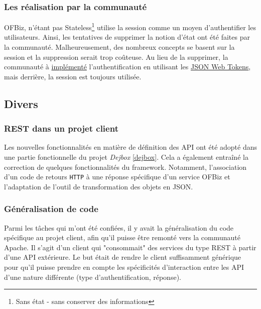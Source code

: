 \subsubsection{Les réalisation par la communauté}
OFBiz, n'étant pas Stateless\footnote{Sans état - sans conserver des informations} utilise la session comme un moyen d'authentifier les utilisateurs. Ainsi, les tentatives de supprimer la notion d'état ont été faites par la communauté. Malheureusement, des nombreux concepts se basent sur la  session et la suppression serait trop coûteuse. Au lieu de la supprimer, la communauté à \href{https://issues.apache.org/jira/browse/OFBIZ-9833}{implémenté} l'authentification en utilisant les \href{https://jwt.io/introduction/}{JSON Web Tokens}, mais derrière, la session est toujours utilisée.
\subsection{Divers}
\subsubsection{REST dans un projet client}
Les nouvelles fonctionnalités en matière de définition des API ont été adopté dans une partie fonctionnelle du projet \emph{Dejbox} \ref{dejbox}. Cela a également entraîné la correction de quelques fonctionnalités du framework. Notamment, l'association d'un code de retours \verb|HTTP| à une réponse spécifique d'un service OFBiz et l'adaptation de l'outil de transformation des objets en JSON.

\subsubsection{Généralisation de code}
Parmi les tâches qui m'ont été confiées, il y avait la généralisation du code spécifique au projet client, afin qu'il puisse être remonté vers la communauté Apache. Il s'agit d'un client qui "consommait" des services du type REST à partir d'une API extérieure. Le but était de rendre le client suffisamment générique pour qu'il puisse prendre en compte les spécificités d'interaction entre les API d'une nature différente (type d'authentification, réponse).


